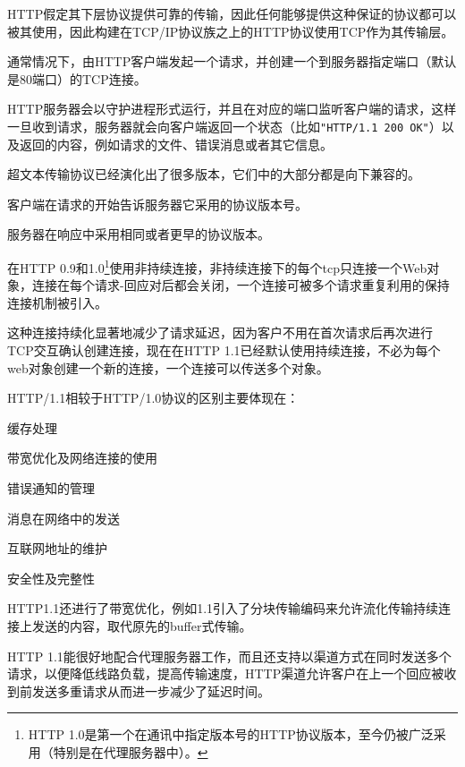 HTTP假定其下层协议提供可靠的传输，因此任何能够提供这种保证的协议都可以被其使用，因此构建在TCP/IP协议族之上的HTTP协议使用TCP作为其传输层。

通常情况下，由HTTP客户端发起一个请求，并创建一个到服务器指定端口（默认是80端口）的TCP连接。

HTTP服务器会以守护进程形式运行，并且在对应的端口监听客户端的请求，这样一旦收到请求，服务器就会向客户端返回一个状态（比如\texttt{"HTTP/1.1 200 OK"}）以及返回的内容，例如请求的文件、错误消息或者其它信息。


超文本传输协议已经演化出了很多版本，它们中的大部分都是向下兼容的。

\begin{compactitem}
\item 客户端在请求的开始告诉服务器它采用的协议版本号。

\item 服务器在响应中采用相同或者更早的协议版本。
\end{compactitem}


在HTTP 0.9和1.0\footnote{HTTP 1.0是第一个在通讯中指定版本号的HTTP协议版本，至今仍被广泛采用（特别是在代理服务器中）。}使用非持续连接，非持续连接下的每个tcp只连接一个Web对象，连接在每个请求-回应对后都会关闭，一个连接可被多个请求重复利用的保持连接机制被引入。

这种连接持续化显著地减少了请求延迟，因为客户不用在首次请求后再次进行TCP交互确认创建连接，现在在HTTP 1.1已经默认使用持续连接，不必为每个web对象创建一个新的连接，一个连接可以传送多个对象。 



HTTP/1.1相较于HTTP/1.0协议的区别主要体现在：

\begin{compactitem}
\item 缓存处理
\item 带宽优化及网络连接的使用
\item 错误通知的管理
\item 消息在网络中的发送
\item 互联网地址的维护
\item 安全性及完整性
\end{compactitem}

HTTP1.1还进行了带宽优化，例如1.1引入了分块传输编码来允许流化传输持续连接上发送的内容，取代原先的buffer式传输。

HTTP 1.1能很好地配合代理服务器工作，而且还支持以渠道方式在同时发送多个请求，以便降低线路负载，提高传输速度，HTTP渠道允许客户在上一个回应被收到前发送多重请求从而进一步减少了延迟时间。

